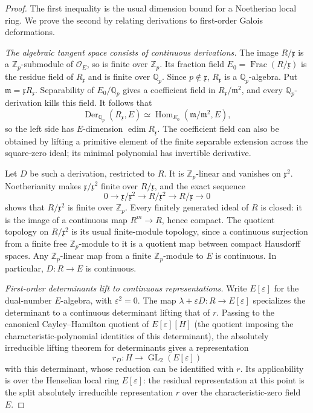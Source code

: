 \documentclass[11pt]{article}
\theoremstyle{remark}
\numberwithin{equation}{section}
\newcommand{\Z}{\mathbb Z}
\newcommand{\Q}{\mathbb Q}
\newcommand{\OO}{\mathcal O}
\newcommand{\frakx}{\mathfrak x}
\newcommand{\frakm}{\mathfrak m}
\newcommand{\eps}{\varepsilon}
\DeclareMathOperator{\Hom}{Hom}
\DeclareMathOperator{\GL}{GL}
\DeclareMathOperator{\Frac}{Frac}
\DeclareMathOperator{\edim}{edim}
\DeclareMathOperator{\Der}{Der}
\begin{document}
\begin{proof}
The first inequality is the usual dimension bound for a
Noetherian local ring. We prove the second by relating derivations
to first-order Galois deformations.

\smallskip\noindent
\emph{The algebraic tangent space consists of continuous derivations.}
The image $R/\frakx$ is a $\Z_p$-submodule of $\OO_E$, so is
finite over $\Z_p$. Its fraction field
$E_0=\Frac(R/\frakx)$ is the residue field of $R_{\frakx}$ and
is finite over $\Q_p$. Since $p\notin\frakx$, $R_{\frakx}$ is
a $\Q_p$-algebra. Put $\frakm=\frakx R_{\frakx}$. Separability
of $E_0/\Q_p$ gives a coefficient field in
$R_{\frakx}/\frakm^2$, and every $\Q_p$-derivation kills this
field. It follows that
\begin{equation}\label{eq:derivations}
 \Der_{\Q_p}(R_{\frakx},E)
 \simeq\Hom_{E_0}(\frakm/\frakm^2,E),
\end{equation}
so the left side has $E$-dimension $\edim R_{\frakx}$.
The coefficient field can also be obtained by lifting a primitive
element of the finite separable extension across the square-zero
ideal; its minimal polynomial has invertible derivative.

Let $D$ be such a derivation, restricted to $R$. It is
$\Z_p$-linear and vanishes on $\frakx^2$. Noetherianity makes
$\frakx/\frakx^2$ finite over $R/\frakx$, and the exact sequence
\[
 0\longrightarrow\frakx/\frakx^2\longrightarrow
 R/\frakx^2\longrightarrow R/\frakx\longrightarrow0
\]
shows that $R/\frakx^2$ is finite over $\Z_p$. Every finitely
generated ideal of $R$ is closed: it is the image of a continuous
map $R^m\to R$, hence compact. The quotient topology on
$R/\frakx^2$ is its usual finite-module topology, since a
continuous surjection from a finite free $\Z_p$-module to it is
a quotient map between compact Hausdorff spaces. Any
$\Z_p$-linear map from a finite $\Z_p$-module to $E$ is
continuous. In particular, $D:R\to E$ is continuous.

\smallskip\noindent
\emph{First-order determinants lift to continuous representations.}
Write $E[\eps]$ for the dual-number $E$-algebra, with $\eps^2=0$.
The map
$\lambda+\eps D:R\to E[\eps]$ specializes the determinant to
a continuous determinant lifting that of $r$. Passing to the
canonical Cayley--Hamilton quotient of $E[\eps][H]$ (the quotient
imposing the characteristic-polynomial identities of this determinant),
the absolutely
irreducible lifting theorem for determinants
\cite[Theorem~2.22(i) and Corollary~2.23]{Chenevier14} gives a
representation
\[
 r_D:H\longrightarrow\GL_2(E[\eps])
\]
with this determinant, whose reduction can be identified with $r$.
Its applicability is over the Henselian local ring $E[\eps]$:
the residual representation at this point is the split absolutely
irreducible representation $r$ over the characteristic-zero
field $E$.


\end{proof}
\end{document}
